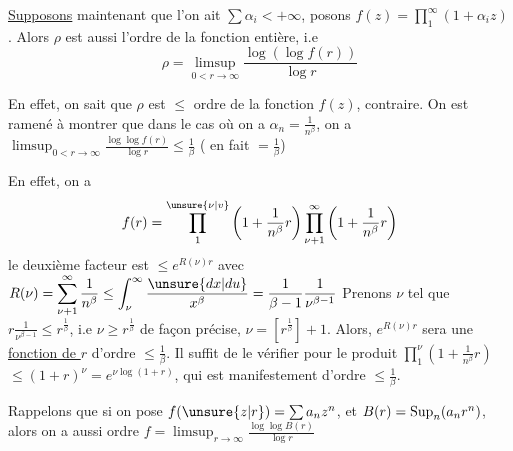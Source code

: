 \uline{Supposons} maintenant que l'on ait $\sum\alpha_i<+\infty$,
posons $f(z)=\prod_1^\infty(1+\alpha_i z)$. Alors $\rho$ est aussi
l'ordre de la fonction entière, i.e
\[ \rho=\limsup_{0<r\to\infty}\frac{\log(\log f(r))}{\log r} \]

En effet, on sait que $\rho$ est $\leq$ ordre de la
fonction $f(z)$,    contraire. On est
ramené à montrer que  dans le
cas où on a $\alpha_n=\frac1{n^\beta}$, on a
$\displaystyle \limsup_{0<r\to\infty}\frac{\log\log f(r)}{\log r}\leq\frac1\beta$ \quad ( en fait $=\frac1\beta$)

En effet, on a
\[ f(r)=\prod_1^{\unsure{\nu|v}}\left(1+\frac1{n^\beta}r\right)\prod_{\nu+1}^{\infty}\left(1+\frac1{n^\beta}r\right) \]
le deuxième facteur est $\leq e^{R(\nu)r}$
avec $\displaystyle R(\nu)=\sum_{\nu+1}^\infty\frac1{n^\beta}\leq\int_\nu^\infty\frac{\unsure{dx|du}}{x^\beta}=\frac1{\beta-1}\frac1{\nu^{\beta-1}}$
Prenons $\nu$ tel que $r\frac1{\nu^{\beta-1}}\leq r^{\frac1\beta}$, i.e $\nu\geq r^{\frac1\beta}$
de façon précise, $\nu=[r^{\frac1\beta}]+1$. Alors, $e^{R(\nu)r}$
sera une \uline{fonction de $r$} d'ordre $\leq\frac1\beta$. Il
suffit de le vérifier pour le produit $\prod_1^\nu(1+\frac1{n^\beta}r)$
$\leq(1+r)^\nu=e^{\nu\log(1+r)}$, qui est manifestement
d'ordre $\leq\frac1\beta$.

Rappelons que si on pose $f(\unsure{z|r})=\sum a_n z^n$,
 et $B(r)=\mathop{\rm Sup}_n(a_n r^n)$, alors on
a aussi \qquad ordre  $f=\limsup_{r\to\infty}\frac{\log\log B(r)}{\log r}$
